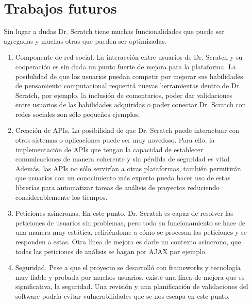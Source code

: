 \documentclass[a4paper, 12pt]{book}
\begin{document}
\section{Trabajos futuros}
\label{sec:trabajos_futuros}


Sin lugar a dudas Dr. Scratch tiene muchas funcionalidades que puede ser agregadas
y muchas otras que pueden ser optimizadas.


\begin{enumerate}
  \item Componente de red social. La interacción entre usuarios de Dr. Scratch y su
	cooperación es sin duda un punto fuerte de mejora para la plataforma. La posibilidad
	de que los usuarios puedan competir por mejorar sus habilidades de pensamiento
	computacional requerirá nuevas herramientas dentro de Dr. Scratch, por ejemplo, la
	inclusión de comentarios, poder dar validaciones entre usuarios de las habilidades
	adquiridas o poder conectar Dr. Scratch con redes sociales son sólo pequeños ejemplos.
  \item Creación de APIs. La posibilidad de que Dr. Scratch puede interactuar con
	otros sistemas o aplicaciones puede ser muy novedoso. Para ello, la implementación
	de APIs que tengan la capacidad de establecer comunicaciones de manera coherente y
	sin pérdida de seguridad es vital. Además, las APIs no sólo servirían a otras
	plataformas, también permitirán que usuarios con un conocimiento más experto pueda
	hacer uso de estas librerías para automatizar tareas de análisis de proyectos 
	reduciendo considerablemente los tiempos.
	\item Peticiones asíncronas. En este punto, Dr. Scratch es capaz de resolver las
	peticiones de usuarios sin problemas, pero toda su funcionamiento se hace de una
	manera muy estática, refiriéndome a cómo se procesan las peticiones y se responden
	a estas. Otra línea de mejora es darle un contexto asíncrono, que todas las 
	peticiones de análisis se hagan por AJAX por ejemplo.
	\item Seguridad. Pese a que el proyecto se desarrolló con frameworks y tecnología 
	muy fiable y probada por muchos usuarios, existe una línea de mejora que es 
	significativa, la seguridad. Una revisión y una planificación de validaciones del
	software podría evitar vulnerabilidades que se nos escapa en este punto. 
\end{enumerate}
\end{document}

